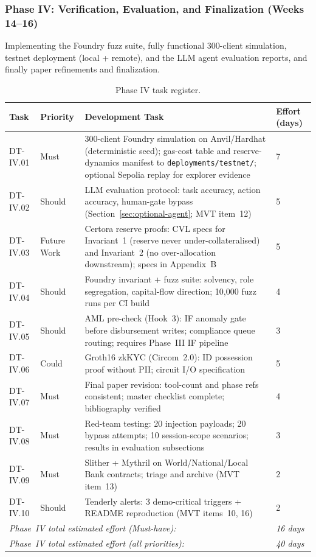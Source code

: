 \documentclass[12pt,a4paper]{report}
\newcommand{\tableheadcolor}{\rowcolor{TableHeadBg}}
\begin{document}
\subsubsection{Phase IV: Verification, Evaluation, and Finalization (Weeks 14--16)}

Implementing the Foundry fuzz suite, fully functional 300-client simulation, testnet deployment (local + remote), and the LLM agent evaluation reports, and finally paper refinements and finalization.

\begin{table}[H]
\centering
\caption[Phase IV task register]{Phase IV task register.}
\label{tab:phaseIV-tasks}
\begin{tabular}{p{1.8cm}p{1.8cm}p{7.5cm}p{1.5cm}}
\toprule
\tableheadcolor
\textbf{Task} & \textbf{Priority} & \textbf{Development Task} & \textbf{Effort (days)} \\
\midrule
DT-IV.01 & Must & 300-client Foundry simulation on Anvil/Hardhat (deterministic seed); gas-cost table and reserve-dynamics manifest to \texttt{deployments/testnet/}; optional Sepolia replay for explorer evidence & 7 \\
DT-IV.02 & Should & LLM evaluation protocol: task accuracy, action accuracy, human-gate bypass (Section~\ref{sec:optional-agent}; MVT item~12) & 5 \\
DT-IV.03 & Future Work & Certora reserve proofs: CVL specs for Invariant~1 (reserve never under-collateralised) and Invariant~2 (no over-allocation downstream); specs in Appendix~B & 5 \\
DT-IV.04 & Should & Foundry invariant + fuzz suite: solvency, role segregation, capital-flow direction; 10{,}000 fuzz runs per CI build & 4 \\
DT-IV.05 & Should & AML pre-check (Hook~3): IF anomaly gate before disbursement writes; compliance queue routing; requires Phase~III IF pipeline & 3 \\
DT-IV.06 & Could & Groth16 zkKYC (Circom~2.0): ID possession proof without PII; circuit I/O specification & 5 \\
DT-IV.07 & Must & Final paper revision: tool-count and phase refs consistent; master checklist complete; bibliography verified & 4 \\
DT-IV.08 & Must & Red-team testing: 20 injection payloads; 20 bypass attempts; 10 session-scope scenarios; results in evaluation subsections & 3 \\
DT-IV.09 & Must & Slither + Mythril on World/National/Local Bank contracts; triage and archive (MVT item~13) & 2 \\
DT-IV.10 & Should & Tenderly alerts: 3 demo-critical triggers + README reproduction (MVT items~10, 16) & 2 \\
\multicolumn{3}{l}{\textit{Phase~IV total estimated effort (Must-have):}} & \textit{16 days} \\
\multicolumn{3}{l}{\textit{Phase~IV total estimated effort (all priorities):}} & \textit{40 days} \\
\bottomrule
\end{tabular}
\end{table}
\end{document}
